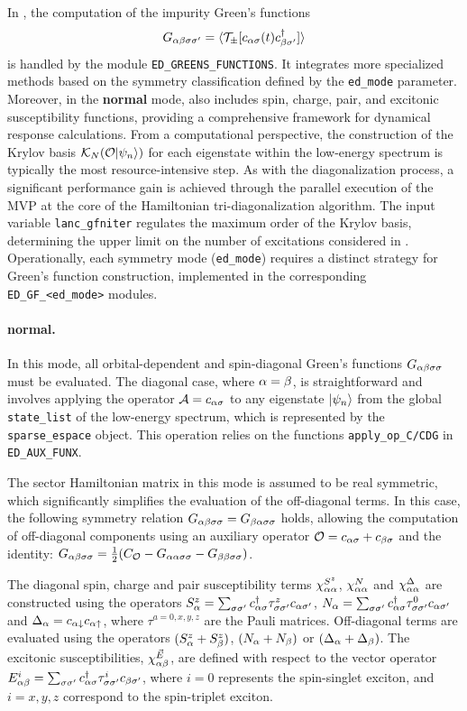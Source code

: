 \documentclass[edipack_sp.tex]{subfiles}
\begin{document}
In \NAME, the computation of the impurity Green's functions 
$$
G_{\alpha\beta\sigma\sigma'}=\langle {\cal T}_\pm[ c_{\alpha\sigma}(t) c_{\beta\sigma'}^\dagger ]\rangle
$$
is handled by the module \texttt{ED\_GREENS\_FUNCTIONS}.
It integrates more specialized methods based on the symmetry
classification defined by the \texttt{ed\_mode} parameter.
Moreover, in the {\bf normal} mode, \NAME also includes spin, charge, pair, and excitonic susceptibility functions, providing a comprehensive framework for dynamical response calculations.
From a computational perspective, the construction of the Krylov basis
$\mathcal{K}_N({\cal O}|\psi_n\rangle)$ for each eigenstate within the low-energy
spectrum is typically the most resource-intensive step.
As with the
diagonalization process, a significant performance gain is achieved through
the parallel execution of the MVP at the core of
the Hamiltonian tri-diagonalization algorithm.
The input variable
\texttt{lanc\_gfniter} regulates the maximum order of the Krylov basis,
determining the upper limit on the number of excitations considered in
.
Operationally, each symmetry mode (\texttt{ed\_mode}) requires a distinct
strategy for Green's function construction, implemented in the corresponding
\texttt{ED\_GF\_<ed\_mode>} modules.


\paragraph{{\bf normal}.}
In this mode, all orbital-dependent and spin-diagonal Green's 
functions $G_{\alpha\beta\sigma\sigma}$ must be evaluated. The diagonal 
case, where $\alpha=\beta$, is straightforward and involves applying 
the operator ${\cal A}=c_{\alpha\sigma}$ to any eigenstate $|\psi_n\rangle$ 
from the global {\tt state\_list} of the low-energy spectrum, 
which is represented by the {\tt sparse\_espace} object. This 
operation relies on the functions {\tt apply\_op\_C/CDG} in 
{\tt ED\_AUX\_FUNX}. 



The sector Hamiltonian matrix in this mode is assumed 
to be real symmetric, which significantly simplifies the evaluation of the off-diagonal terms. In this case, the following symmetry relation 
$G_{\alpha\beta\sigma\sigma}=G_{\beta\alpha\sigma\sigma}$ holds, allowing the computation of 
off-diagonal components using an auxiliary operator 
${\cal O}=c_{\alpha\sigma}+c_{\beta\sigma}$ and the identity:
$G_{\alpha\beta\sigma\sigma}=\tfrac{1}{2}(C_{\cal O} - G_{\alpha\alpha\sigma\sigma} - G_{\beta\beta\sigma\sigma})$.

The diagonal spin, charge and pair susceptibility terms
$\chi^{S^z}_{\alpha\alpha}$, $\chi^N_{\alpha\alpha}$ and $\chi^\Delta_{\alpha\alpha}$
are constructed using the operators $S^z_\alpha = \sum_{\sigma\sigma'} c^\dagger_{\alpha\sigma}
\tau^z_{\sigma\sigma'} c_{\alpha\sigma'}$, 
$N_\alpha = \sum_{\sigma\sigma'} c^\dagger_{\alpha\sigma} \tau^0_{\sigma\sigma'} c_{\alpha\sigma'}$
and $\Delta_\alpha = c_{\alpha\downarrow}c_{\alpha\uparrow}$,
where $\tau^{a=0,x,y,z}$ are the Pauli matrices.
Off-diagonal terms are  evaluated using the operators
$(S^z_\alpha + S^z_\beta)$, $(N_\alpha + N_\beta)$ or $(\Delta_\alpha + \Delta_\beta)$. 
The excitonic susceptibilities, $\chi^{\vec{E}}_{\alpha\beta}$, are defined with 
respect to the vector operator $E^i_{\alpha\beta} = \sum_{\sigma\sigma'}
c^\dagger_{\alpha\sigma}\tau^i_{\sigma\sigma'}c_{\beta\sigma'}$, where $i=0$ represents the
spin-singlet exciton\cite{Giuli2023PRB}, and $i=x,y,z$  correspond to the spin-triplet exciton.
\end{document}
